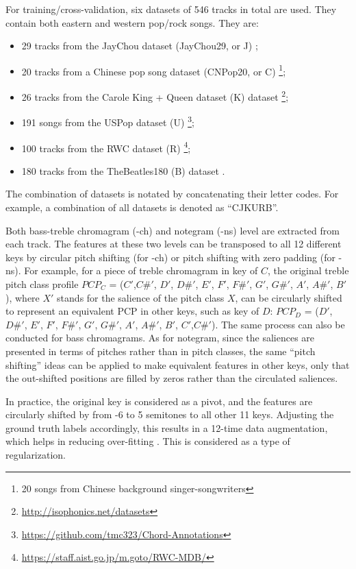 For training/cross-validation, six datasets of 546 tracks in total are used. They contain both eastern and western pop/rock songs. They are:
\begin{itemize}
	\item 29 tracks from the JayChou dataset (JayChou29, or J) \cite{dengmirex};
	\item 20 tracks from a Chinese pop song dataset (CNPop20, or C) \footnote{20 songs from Chinese background singer-songwriters};
	\item 26 tracks from the Carole King + Queen dataset (K) dataset \footnote{\url{http://isophonics.net/datasets}};
	\item 191 songs from the USPop dataset (U) \footnote{\url{https://github.com/tmc323/Chord-Annotations}};
	\item 100 tracks from the RWC dataset (R) \footnote{\url{https://staff.aist.go.jp/m.goto/RWC-MDB/}};
	\item 180 tracks from the TheBeatles180 (B) dataset \cite{harte2010towards}. 
\end{itemize}
The combination of datasets is notated by concatenating their letter codes. For example, a combination of all datasets is denoted as ``CJKURB''.

Both bass-treble chromagram (-ch) and notegram (-ns) level are extracted from each track. The features at these two levels can be transposed to all 12 different keys by circular pitch shifting (for -ch) or pitch shifting with zero padding (for -ns). For example, for a piece of treble chromagram in key of $C$, the original treble pitch class profile $PCP_C$ = ($C'$,$C\#'$, $D'$, $D\#'$, $E'$, $F'$, $F\#'$, $G'$, $G\#'$, $A'$, $A\#'$, $B'$), where $X'$ stands for the salience of the pitch class $X$, can be circularly shifted to represent an equivalent PCP in other keys, such as key of $D$: $PCP_D$ = ($D'$, $D\#'$, $E'$, $F'$, $F\#'$, $G'$, $G\#'$, $A'$, $A\#'$, $B'$, $C'$,$C\#'$). The same process can also be conducted for bass chromagrams. As for notegram, since the saliences are presented in terms of pitches rather than in pitch classes, the same ``pitch shifting'' ideas can be applied to make equivalent features in other keys, only that the out-shifted positions are filled by zeros rather than the circulated saliences.

In practice, the original key is considered as a pivot, and the features are circularly shifted by from -6 to 5 semitones to all other 11 keys. Adjusting the ground truth labels accordingly, this results in a 12-time data augmentation, which helps in reducing over-fitting \cite{cho2014improved,humphrey2015exploration}. This is considered as a type of regularization.

